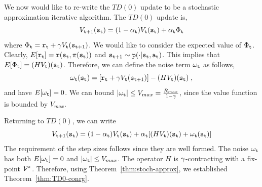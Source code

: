 
We now would like to re-write the $TD(0)$ update to be a stochastic
approximation iterative algorithm. The $TD(0)$ update is,
\[
V_{{\tt t}+1}({\tt s}_{\tt t})=(1-\alpha_{\tt t})V_{\tt t}({\tt s}_{\tt t})+\alpha_{\tt t}
\Phi_{\tt t}
\]
where $\Phi_{\tt t}={\tt r}_{\tt t}+\gamma
V_{\tt t}({\tt s}_{{\tt t}+1})$. We would like to consider the expected
value of $\Phi_{\tt t}$. Clearly,
$E[{\tt r}_{\tt t}]={\tt r}({\tt s}_{\tt t},\pi({\tt s}_{\tt t}))$
and ${\tt s}_{{\tt t}+1} \sim {\tt p}(\cdot |{\tt s}_{\tt t},{\tt a}_{\tt t})$.
This implies that $E[\Phi_{\tt t}]=(HV_{\tt t})({\tt s}_{\tt t})$.
Therefore, we can define the noise term $\omega_{\tt t}$ as follows,
\[
\omega_{\tt t}({\tt s}_{\tt t})=[{\tt r}_{\tt t}+\gamma
V_{\tt t}({\tt s}_{{\tt t}+1})]-(HV_{\tt t})({\tt s}_{\tt t})\;,
\]
and have $E[\omega_{\tt t}]=0$. We can bound $|\omega_{\tt t}|\leq
V_{max}=\frac{R_{max}}{1-\gamma}$, since the value function is
bounded by $V_{max}$.

Returning to $TD(0)$, we can write
\[
V_{{\tt t}+1}({\tt s}_{\tt t})=(1-\alpha_{\tt t})V_{\tt t}({\tt s}_{\tt t})+\alpha_{\tt t}
[(HV_{\tt t})({\tt s}_{\tt t})+\omega_{\tt t}({\tt s}_{\tt t})]
\]
The requirement of the step sizes follows since they are well formed. The noise $\omega_{\tt t}$ has both
$E[\omega_{\tt t}]=0$ and $|\omega_{\tt t}|\leq V_{max}$. The
operator $H$ is $\gamma$-contracting with a fix-point $\mathcal{V}^\pi$.
Therefore, using Theorem~\ref{thm:stoch-approx}, we established
Theorem~\ref{thm:TD0-conrg}.

